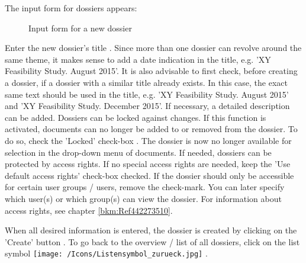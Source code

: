 \vspace{\baselineskip}

The input form for dossiers appears:

\begin{figure}[H]
\caption{Input form for a new dossier}
\end{figure}

Enter the new dossier's title . Since more than one dossier can revolve around the same theme, it makes sense to add a date indication in the title, e.g. 'XY Feasibility Study. August 2015'. It is also advisable to first check, before creating a dossier, if a dossier with a similar title already exists. In this case, the exact same text should be used in the title, e.g. 'XY Feasibility Study. August 2015' and 'XY Feasibility Study. December 2015'. If necessary, a detailed description  can be added. Dossiers can be locked against changes. If this function is activated, documents can no longer be added to or removed from the dossier. To do so, check the 'Locked' check-box . The dossier is now no longer available for selection in the drop-down menu of documents. If needed, dossiers can be protected by access rights. If no special access rights are needed, keep the 'Use default access rights' check-box  checked. If the dossier should only be accessible for certain user groups / users, remove the check-mark. You can later specify which user(s) or which group(s) can view the dossier. For information about access rights, see chapter \ref{bkm:Ref442273510}. \newline

When all desired information is entered, the dossier is created by clicking on the 'Create' button . To go back to the overview / list of all dossiers, click on the list symbol \texttt{[image: /Icons/Listensymbol\_zurueck.jpg]} .

